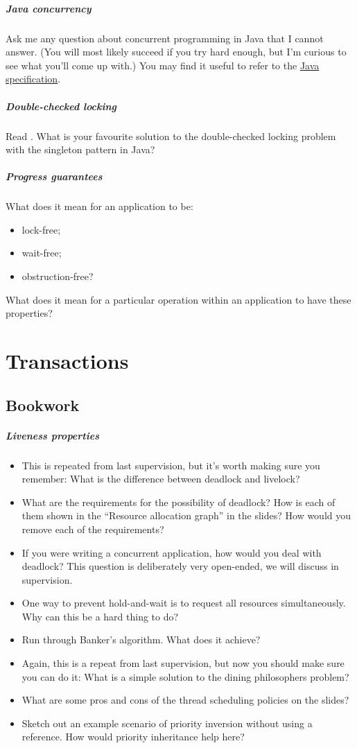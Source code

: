 \documentclass[12pt,a4paper,oneside,openright]{report}
\newcommand{\question}[2]{\paragraph{#1} #2}
\begin{document}
\question{Java concurrency}{Ask me any question about concurrent
  programming in Java that I cannot answer. (You will most likely
  succeed if you try hard enough, but I'm curious to see what you'll
  come up with.) You may find it useful to refer to the
  \href{https://docs.oracle.com/javase/specs/jls/se15/html/jls-17.html}{Java
    specification}.}

\question{Double-checked locking}{Read \cite{DCL}. What is your
  favourite solution to the double-checked locking problem with the
  singleton pattern in Java?}

\question{Progress guarantees}{What does it mean for an application to
  be:
  \begin{itemize}
  \item lock-free;
  \item wait-free;
  \item obstruction-free?
  \end{itemize}
  What does it mean for a particular operation within an application
  to have these properties?  }

\chapter{Transactions}

\section{Bookwork}

\question{Liveness properties}{
  \begin{itemize}
  \item This is repeated from last supervision, but it's worth making
    sure you remember: What is the difference between deadlock and
    livelock?
  \item What are the requirements for the possibility of deadlock? How
    is each of them shown in the ``Resource allocation graph'' in the
    slides? How would you remove each of the requirements?
  \item If you were writing a concurrent application, how would you
    deal with deadlock? This question is deliberately very open-ended,
    we will discuss in supervision.
  \item One way to prevent hold-and-wait is to request all resources
    simultaneously. Why can this be a hard thing to do?
  \item Run through Banker's algorithm. What does it achieve?
  \item Again, this is a repeat from last supervision, but now you
    should make sure you can do it: What is a simple solution to the
    dining philosophers problem?
  \item What are some pros and cons of the thread scheduling policies
    on the slides?
  \item Sketch out an example scenario of priority inversion without
    using a reference. How would priority inheritance help here?
  \end{itemize}
}
\end{document}
